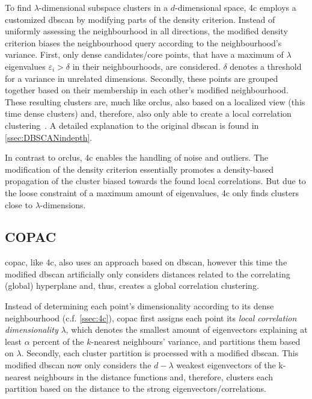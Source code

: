 To find $\lambda$-dimensional subspace clusters in a $d$-dimensional space, \gls{4c} employs a customized \acrshort{dbscan} by modifying parts of the density criterion. 
Instead of uniformly assessing the neighbourhood in all directions, the modified density criterion biases the neighbourhood query according to the neighbourhood's variance. First, only dense candidates/core points, that have a maximum of $\lambda$ eigenvalues $\varepsilon_i > \delta$ in their neighbourhoods, are considered. $\delta$ denotes a threshold for a variance in unrelated dimensions. Secondly, these points are grouped together based on their membership in each other's modified neighbourhood. These resulting clusters are, much like \gls{orclus}, also based on a localized view (this time dense clusters) and, therefore, also only able to create a local correlation clustering~\cite{4cbohm2004computing}. A detailed explanation to the original \acrshort{dbscan} is found in \autoref{ssec:DBSCANindepth}.

In contrast to \gls{orclus}, \gls{4c} enables the handling of noise and outliers. The modification of the density criterion essentially promotes a density-based propagation of the cluster biased towards the found local correlations.
But due to the loose constraint of a maximum amount of eigenvalues, \gls{4c} only finds clusters close to $\lambda$-dimensions.

\subsection{COPAC}
\gls{copac}, like \gls{4c}, also uses an approach based on \acrshort{dbscan}, however this time the modified \acrshort{dbscan} artificially only considers distances related to the correlating (global) hyperplane and, thus, creates a global correlation clustering. 

Instead of determining each point's dimensionality according to its dense neighbourhood (c.f. \autoref{ssec:4c}), \gls{copac} first assigns each point its \textit{local correlation dimensionality} $\lambda$, which denotes the smallest amount of eigenvectors explaining at least $\alpha$ percent of the $k$-nearest neighbours' variance, and partitions them based on $\lambda$. Secondly, each cluster partition is processed with a modified \acrshort{dbscan}. This modified \acrshort{dbscan} now only considers the $d-\lambda$ weakest eigenvectors of the k-nearest neighbours in the distance functions and, therefore, clusters each partition based on the distance to the strong eigenvectors/correlations.

